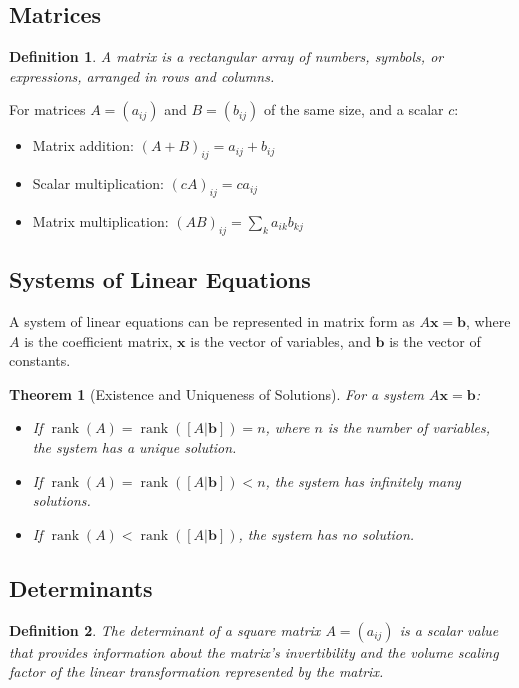 \documentclass[12pt,a4paper]{article}
\DeclareMathOperator{\rank}{rank}
\newtheorem{definition}{Definition}
\newtheorem{theorem}{Theorem}
\begin{document}
\subsection{Matrices}

\begin{definition}
A matrix is a rectangular array of numbers, symbols, or expressions, arranged in rows and columns.
\end{definition}

For matrices $A = (a_{ij})$ and $B = (b_{ij})$ of the same size, and a scalar $c$:

\begin{itemize}
    \item Matrix addition: $(A + B)_{ij} = a_{ij} + b_{ij}$
    \item Scalar multiplication: $(cA)_{ij} = ca_{ij}$
    \item Matrix multiplication: $(AB)_{ij} = \sum_k a_{ik}b_{kj}$
\end{itemize}

\subsection{Systems of Linear Equations}

A system of linear equations can be represented in matrix form as $A\mathbf{x} = \mathbf{b}$, where $A$ is the coefficient matrix, $\mathbf{x}$ is the vector of variables, and $\mathbf{b}$ is the vector of constants.

\begin{theorem}[Existence and Uniqueness of Solutions]
    For a system $A\mathbf{x} = \mathbf{b}$:
    \begin{itemize}
        \item If $\rank(A) = \rank([A|\mathbf{b}]) = n$, where $n$ is the number of variables, the system has a unique solution.
        \item If $\rank(A) = \rank([A|\mathbf{b}]) < n$, the system has infinitely many solutions.
        \item If $\rank(A) < \rank([A|\mathbf{b}])$, the system has no solution.
    \end{itemize}
    \end{theorem}

\subsection{Determinants}

\begin{definition}
The determinant of a square matrix $A = (a_{ij})$ is a scalar value that provides information about the matrix's invertibility and the volume scaling factor of the linear transformation represented by the matrix.
\end{definition}
\end{document}
